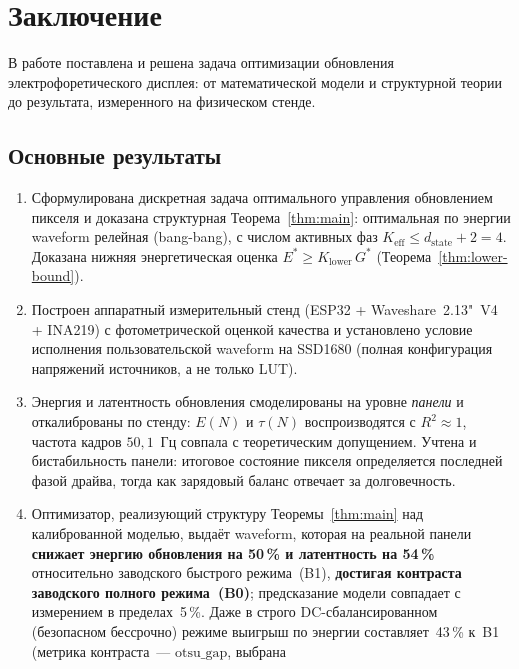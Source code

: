 \chapter{Заключение}\label{ch:conclusion}

В работе поставлена и решена задача оптимизации обновления электрофоретического
дисплея: от математической модели и структурной теории до результата,
измеренного на физическом стенде.

\section*{Основные результаты}

\begin{enumerate}
    \item Сформулирована дискретная задача оптимального управления обновлением
        пикселя и доказана структурная Теорема~\ref{thm:main}: оптимальная по
        энергии waveform релейная (bang-bang), с числом активных фаз
        $K_{\mathrm{eff}}\le d_{\mathrm{state}}+2=4$. Доказана нижняя
        энергетическая оценка $E^{*}\ge K_{\mathrm{lower}}\,G^{*}$
        (Теорема~\ref{thm:lower-bound}).
    \item Построен аппаратный измерительный стенд (ESP32 + Waveshare~2.13"~V4 +
        INA219) с фотометрической оценкой качества и установлено условие
        исполнения пользовательской waveform на SSD1680 (полная конфигурация
        напряжений источников, а не только LUT).
    \item Энергия и латентность обновления смоделированы на уровне \emph{панели}
        и откалиброваны по стенду: $E(N)$ и $\tau(N)$ воспроизводятся с
        $R^2\approx1$, частота кадров $50{,}1$~Гц совпала с теоретическим
        допущением. Учтена и бистабильность панели: итоговое состояние пикселя
        определяется последней фазой драйва, тогда как зарядовый баланс отвечает
        за долговечность.
    \item Оптимизатор, реализующий структуру Теоремы~\ref{thm:main} над
        калиброванной моделью, выдаёт waveform, которая на реальной панели
        \textbf{снижает энергию обновления на 50\,\% и латентность на 54\,\%}
        относительно заводского быстрого режима~(B1), \textbf{достигая контраста
        заводского полного режима~(B0)}; предсказание
        модели совпадает с измерением в пределах~5\,\%. Даже в строго
        DC-сбалансированном (безопасном бессрочно) режиме выигрыш по энергии
        составляет~43\,\% к~B1 (метрика контраста~--- $\mathrm{otsu\_gap}$, выбрана

\end{enumerate}
